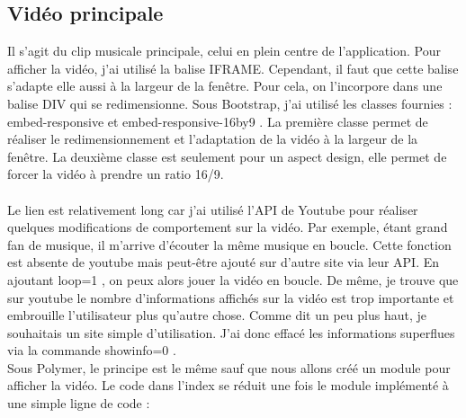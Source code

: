 \documentclass{article}
\begin{document}
\subsection{Vid\'eo principale}

Il s'agit du clip musicale principale, celui en plein centre de l'application. Pour afficher la vid\'eo, j'ai utilis\'e la balise IFRAME. Cependant, il faut que cette balise s'adapte elle aussi \`a la largeur de la fen\^etre. Pour cela, on l'incorpore dans une balise DIV qui se redimensionne. Sous Bootstrap, j'ai utilis\'e les classes fournies : \og embed-responsive \fg{} et \og embed-responsive-16by9 \fg{}. La premi\`ere classe permet de r\'ealiser le redimensionnement et l'adaptation de la vid\'eo \`a la largeur de la fen\^etre. La deuxi\`eme classe est seulement pour un aspect design, elle permet de forcer la vid\'eo \`a prendre un ratio 16/9.
\vspace{0.5cm}\\
\vspace{0.5cm}\\
Le lien est relativement long car j'ai utilis\'e l'API de Youtube pour r\'ealiser quelques modifications de comportement sur la vid\'eo. Par exemple, \'etant grand fan de musique, il m'arrive d'\'ecouter la m\^eme musique en boucle. Cette fonction est absente de youtube mais peut-\^etre ajout\'e sur d'autre site via leur API. En ajoutant \og loop=1 \fg{}, on peux alors jouer la vid\'eo en boucle. De m\^eme, je trouve que sur youtube le nombre d'informations affich\'es sur la vid\'eo est trop importante et embrouille l'utilisateur plus qu'autre chose. Comme dit un peu plus haut, je souhaitais un site simple d'utilisation. J'ai donc effac\'e les informations superflues via la commande \og showinfo=0 \fg{}.  
\vspace{0.5cm}\\
Sous Polymer, le principe est le m\^eme sauf que nous allons cr\'e\'e un module pour afficher la vid\'eo. Le code dans l'index se r\'eduit une fois le module impl\'ement\'e \`a une simple ligne de code :
\vspace{0.5cm}\\
\end{document}
